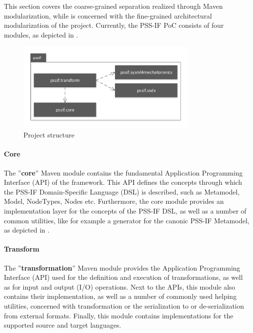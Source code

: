 This section covers the coarse-grained separation realized through Maven modularization, while  is concerned with the fine-grained architectural modularization of the project. Currently, the PSS-IF PoC consists of four modules, as depicted in  .

\begin{figure}
\centering
\includegraphics[width=0.8\textwidth]{figures/project-structure.pdf}
\caption{Project structure}
\label{fig:structure}
\end{figure}

\paragraph{Core} The ''\textbf{core}'' Maven module contains the fundamental Application Programming Interface (API) of the framework. This API defines the concepts through which the PSS-IF Domain-Specific Language (DSL) is described, such as Metamodel, Model, NodeTypes, Nodes etc. Furthermore, the core module provides an implementation layer for the concepts of the PSS-IF DSL, as well as a number of common utilities, like for example a generator for the canonic PSS-IF Metamodel, as depicted in .

\paragraph{Transform} The ''\textbf{transformation}'' Maven module provides the Application Programming Interface (API) used for the definition and execution of transformations, as well as for input and output (I/O) operations. Next to the APIs, this module also contains their implementation, as well as a number of commonly used helping utilities, concerned with transformation or the serialization to or de-serialization from external formats. Finally, this module contains implementations for the supported source and target languages.

